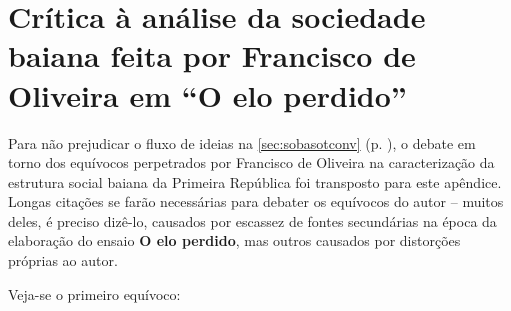 \chapter{Crítica à análise da sociedade baiana feita por Francisco de\\ Oliveira em ``O elo perdido''}\label{ap:2}

Para não prejudicar o fluxo de ideias na \autoref{sec:sobasotconv} (p.  \pageref{sec:sobasotconv}), o debate em torno dos equívocos perpetrados por Francisco de Oliveira na caracterização da estrutura social baiana da Primeira República foi transposto para este apêndice. Longas citações se farão necessárias para debater os equívocos do autor -- muitos deles, é preciso dizê-lo, causados por escassez de fontes secundárias na época da elaboração do ensaio \textbf{O elo perdido}, mas outros causados por distorções próprias ao autor.

Veja-se o primeiro equívoco:


